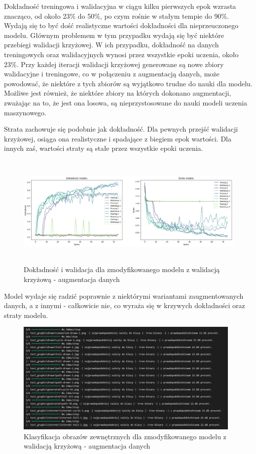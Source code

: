 Dokładność treningowa i walidacyjna w ciągu kilku pierwszych epok wzrasta znacząco,
od około 23\% do 50\%, po czym rośnie w stałym tempie do 90\%.
Wydają się to być dość realistyczne wartości dokładności dla nieprzeuczonego modelu.
Głównym problemem w tym przypadku wydają się być niektóre przebiegi walidacji krzyżowej.
W ich przypadku, dokładność na danych treningowych oraz walidacyjnych wynosi przez wszystkie epoki uczenia, około 23\%.
Przy każdej iteracji walidacji krzyżowej generowane są nowe zbiory walidacyjne i treningowe,
co w połączeniu z augmentacją danych, może powodować, że niektóre z tych zbiorów są wyjątkowo trudne do nauki dla modelu.
Możliwe jest również, że niektóre zbiory na których dokonano augmentacji, zważając na to, że jest ona losowa,
są nieprzystosowane do nauki modeli uczenia maszynowego.

Strata zachowuje się podobnie jak dokładność. Dla pewnych przejść walidacji krzyżowej, osiąga ona realistyczne
i spadające z biegiem epok wartości. Dla innych zaś, wartości straty są stałe przez wszystkie epoki uczenia.

\begin{figure}[ht]
	\centering
	\includegraphics[height=5.5cm]{resources/tests/images/v4/crossvalid_3_img.png}
	\caption{Dokładność i walidacja dla zmodyfikowanego modelu z walidacją krzyżową - augmentacja danych}
	\label{Fig:tests-cv-3a}
\end{figure}
\FloatBarrier

Model wydaje się radzić poprawnie z niektórymi wariantami zaugmentowanych danych, a z innymi - całkowicie nie,
co wyraża się w krzywych dokładności oraz straty modelu.

\begin{figure}[ht]
	\centering
	\includegraphics[height=5.5cm]{resources/tests/images/v4/crossvalid_3_txt.png}
	\caption{Klasyfikacja obrazów zewnętrznych dla zmodyfikowanego modelu z walidacją krzyżową - augmentacja danych}
	\label{Fig:tests-cv-3b}
\end{figure}
\FloatBarrier

